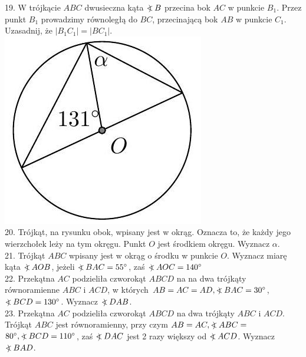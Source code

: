 \documentclass[10pt]{article}
\newcommand\Varangle{\mathop{{<\!\!\!\!\!\text{\small)}}\:}\nolimits}
\begin{document}
19. W trójkącie \(A B C\) dwusieczna kąta \(\Varangle B\) przecina bok \(A C\) w punkcie \(B_{1}\). Przez punkt \(B_{1}\) prowadzimy równoległą do \(B C\), przecinającą bok \(A B\) w punkcie \(C_{1}\). Uzasadnij, że \(\left|B_{1} C_{1}\right|=\left|B C_{1}\right|\).\\
\includegraphics[max width=\textwidth, center]{2024_11_21_71f62bd117d375398909g-172(1)}\\
20. Trójkąt, na rysunku obok, wpisany jest w okrąg. Oznacza to, że każdy jego wierzchołek leży na tym okręgu. Punkt \(O\) jest środkiem okręgu. Wyznacz \(\alpha\).\\
21. Trójkąt \(A B C\) wpisany jest w okrąg o środku w punkcie \(O\). Wyznacz miarę kąta \(\Varangle A O B\), jeżeli \(\Varangle B A C=55^{\circ}\), zaś \(\Varangle A O C=140^{\circ}\)\\
22. Przekątna \(A C\) podzieliła czworokąt \(A B C D\) na na dwa trójkąty równoramienne \(A B C\) i \(A C D\), w których \(A B=A C=A D, \Varangle B A C=30^{\circ}\), \(\Varangle B C D=130^{\circ}\). Wyznacz \(\Varangle D A B\).\\
23. Przekątna \(A C\) podzieliła czworokąt \(A B C D\) na dwa trójkąty \(A B C\) i \(A C D\). Trójkąt \(A B C\) jest równoramienny, przy czym \(A B=A C, \Varangle A B C=\) \(80^{\circ}, \Varangle B C D=110^{\circ}\), zaś \(\Varangle D A C\) jest 2 razy większy od \(\Varangle A C D\). Wyznacz \(\Varangle B A D\).\\
\end{document}
